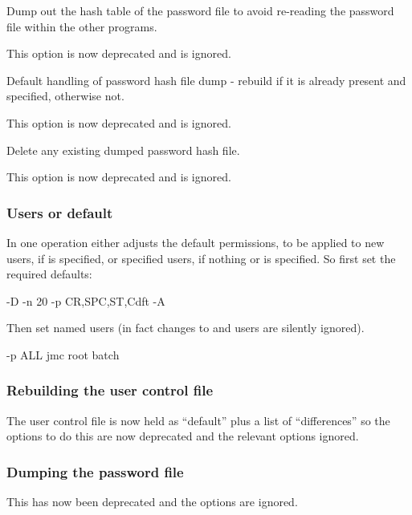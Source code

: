 Dump out the hash table of the password file to avoid re-reading the password file within the other programs.

This option is now deprecated and is ignored.


Default handling of password hash file dump - rebuild if it is already present and  specified, otherwise not.

This option is now deprecated and is ignored.


Delete any existing dumped password hash file.

This option is now deprecated and is ignored.


\subsubsection{Users or default}
In one operation \PrBtuchange{} either adjusts the default permissions, to be applied to new users, if
 is specified, or specified users, if nothing or  is specified. So first set the
required defaults:

\begin{expara}

\BtuchangeName{} -D -n 20 -p CR,SPC,ST,Cdft -A

\end{expara}

Then set named users (in fact changes to  and \batchuser{} users are silently ignored).

\begin{expara}

\BtuchangeName{} -p ALL jmc root batch

\end{expara}

\subsubsection{Rebuilding the user control file}

The user control file is now held as ``default'' plus a list of ``differences'' so the options to do this are now deprecated and the
relevant options ignored.

\subsubsection{Dumping the password file}
This has now been deprecated and the options are ignored.

